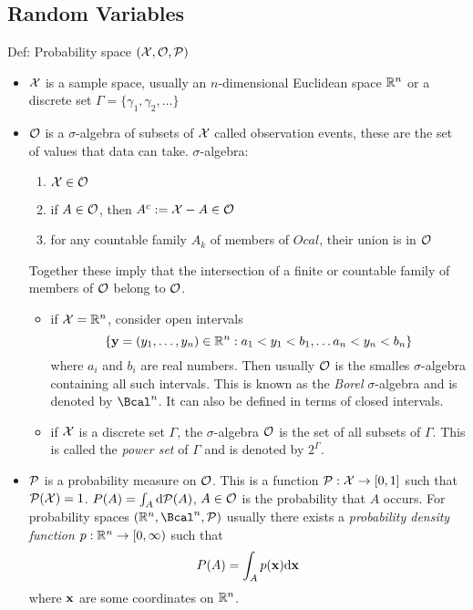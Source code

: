 \subsection{Random Variables}
Def: Probability space $(\mathcal{X}, \mathcal{O}, \mathcal{P})$  
\begin{itemize}
\item $\mathcal{X}$ is a sample space, usually an $n$-dimensional Euclidean space $\mathbb{R}^n$ or a discrete set $\Gamma=\{\gamma_1,\gamma_2, \ldots\}$
\item $\mathcal{O}$ is a $\sigma$-algebra of subsets of $\mathcal{X}$ called observation events, these are the set of values that data can take. 
$\sigma$-algebra:
\begin{enumerate}
\item $\mathcal{X} \in \mathcal{O}$
\item if $A \in \mathcal{O}$, then $A^c := \mathcal{X} - A \in \mathcal{O}$
\item for any countable family $A_k$ of members of $Ocal$, their union is in $\mathcal{O}$
\end{enumerate}
Together these imply that the intersection of a finite or countable family of members of $\mathcal{O}$ belong to $\mathcal{O}$.
\begin{itemize}
\item if $\mathcal{X}=\mathbb{R}^n$, consider open intervals 
\begin{equation}
\label{eq:openInts}
\{ {\mathbf{y}} = (y_1,\ldots, y_n)\in \mathbb{R}^n : a_1 < y_1 < b_1, \ldots a_n < y_n < b_n \}
\end{equation}
where $a_i$ and $b_i$ are real numbers. Then usually $\mathcal{O}$ is the smalles $\sigma$-algebra containing all such intervals. This is known as the \textit{Borel} $\sigma$-algebra and is denoted by $\Bcal^n$. It can also be defined in terms of closed intervals.
\item if $\mathcal{X}$ is a discrete set $\Gamma$, the $\sigma$-algebra $\mathcal{O}$ is the set of all subsets of $\Gamma$. This is called the \textit{power set} of $\Gamma$ and is denoted by $2^{\Gamma}$.
\end{itemize}
\item $\mathcal{P}$ is a probability measure on $\mathcal{O}$. This is a function $\mathcal{P}:\mathcal{X} \rightarrow [0,1]$ such that $\mathcal{P}(\mathcal{X})=1$. $P(A)=\int_A {\mbox{d}} \mathcal{P}(A)$, $A\in \mathcal{O}$ is the probability that $A$ occurs. For probability spaces $(\Rbb^n, \Bcal^n, \Pcal)$ usually there exists a \textit{probability density function} $p: \mathbb{R}^n \rightarrow [0,\infty) $ such that 
\begin{equation}
P(A)=\int_A p(\mathbf{x}) {\mbox{d}} \mathbf{x}
\end{equation}
where $\mathbf{x}$ are some coordinates on $\mathbb{R}^n$. 
\end{itemize}

